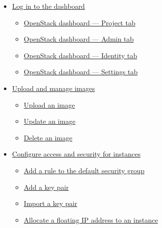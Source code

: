 \documentclass[a4paper]{article}
\begin{document}
\begin{itemize}
  \item \href{https://docs.openstack.org/horizon/pike/user/log-in.html}{Log in to the dashboard}
\begin{itemize}
\item \href{https://docs.openstack.org/horizon/pike/user/log-in.html#openstack-dashboard-project-tab}{OpenStack dashboard — Project tab}
\item \href{https://docs.openstack.org/horizon/pike/user/log-in.html#openstack-dashboard-admin-tab}{OpenStack dashboard — Admin tab}
\item \href{https://docs.openstack.org/horizon/pike/user/log-in.html#openstack-dashboard-identity-tab}{OpenStack dashboard — Identity tab}
\item \href{https://docs.openstack.org/horizon/pike/user/log-in.html#openstack-dashboard-settings-tab}{OpenStack dashboard — Settings tab}
\end{itemize}
  \item \href{https://docs.openstack.org/horizon/pike/user/manage-images.html}{Upload and manage images}
\begin{itemize}
\item \href{https://docs.openstack.org/horizon/pike/user/manage-images.html#upload-an-image}{Upload an image}
\item \href{https://docs.openstack.org/horizon/pike/user/manage-images.html#update-an-image}{Update an image}
\item \href{https://docs.openstack.org/horizon/pike/user/manage-images.html#delete-an-image}{Delete an image}
\end{itemize}
  \item \href{https://docs.openstack.org/horizon/pike/user/configure-access-and-security-for-instances.html}{Configure access and security for instances}
\begin{itemize}
\item \href{https://docs.openstack.org/horizon/pike/user/configure-access-and-security-for-instances.html#add-a-rule-to-the-default-security-group}{Add a rule to the default security group}
\item \href{https://docs.openstack.org/horizon/pike/user/configure-access-and-security-for-instances.html#add-a-key-pair}{Add a key pair}
\item \href{https://docs.openstack.org/horizon/pike/user/configure-access-and-security-for-instances.html#import-a-key-pair}{Import a key pair}
\item \href{https://docs.openstack.org/horizon/pike/user/configure-access-and-security-for-instances.html#allocate-a-floating-ip-address-to-an-instance}{Allocate a floating IP address to an instance}

\end{itemize}
\end{itemize}
\end{document}
